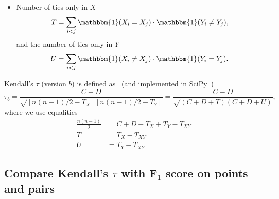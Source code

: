 \begin{itemize}
\item Number of ties only in $X$
      \begin{equation*}
      T = \sum_{i < j} \mathbbm{1}(X_i = X_j) \cdot \mathbbm{1}(Y_i \ne Y_j),
      \end{equation*}
      and the number of ties only in $Y$
      \begin{equation*}
      U = \sum_{i < j} \mathbbm{1}(X_i \ne X_j) \cdot \mathbbm{1}(Y_i = Y_j).
      \end{equation*}
\end{itemize}

Kendall's $\tau$ (version $b$) is defined as~\cite{kendall1945,agresti2010analysis} (and implemented in SciPy~\cite{scipy})
\begin{equation*}
\tau_b = \frac{C - D}{\sqrt{[n(n-1)/2 - T_X] [n(n-1)/2 - T_Y]}} = \frac{C - D}{\sqrt{(C + D + T) (C + D + U)}},
\end{equation*}
where we use equalities 
\begin{align*}
\frac{n(n-1)}{2} &= C + D + T_X + T_Y - T_{XY} \\
T &= T_X - T_{XY} \\
U &= T_Y - T_{XY}
\end{align*}



\subsection{Compare Kendall's $\tau$ with F$_1$ score on points and pairs}
\label{sec:metriccomparison}


